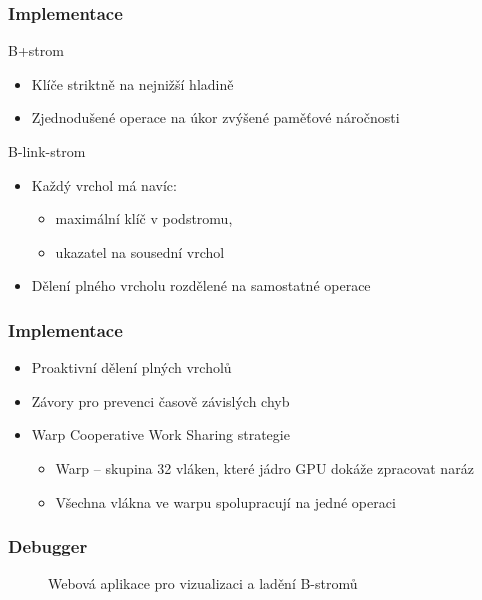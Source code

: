 \documentclass[aspectratio=169]{beamer}
\begin{document}
\begin{frame}
  \frametitle{Implementace}

  B+strom
  \begin{itemize}
    \item Klíče striktně na nejnižší hladině
    \item Zjednodušené operace na úkor zvýšené paměťové náročnosti
  \end{itemize}

  B-link-strom
  \begin{itemize}
    \item Každý vrchol má navíc:
          \begin{itemize}
            \item maximální klíč v podstromu,
            \item ukazatel na sousední vrchol
          \end{itemize}
    \item Dělení plného vrcholu rozdělené na samostatné operace
  \end{itemize}
\end{frame}

\begin{frame}
  \frametitle{Implementace}
  \begin{itemize}
    \item Proaktivní dělení plných vrcholů
    \item Závory pro prevenci časově závislých chyb
    \item Warp Cooperative Work Sharing strategie
          \begin{itemize}
            \item Warp -- skupina 32 vláken, které jádro GPU dokáže zpracovat naráz
            \item Všechna vlákna ve warpu spolupracují na jedné operaci
          \end{itemize}
  \end{itemize}
\end{frame}

\begin{frame}
  \frametitle{Debugger}
  \begin{figure}
    \caption{Webová aplikace pro vizualizaci a ladění B-stromů}
  \end{figure}
\end{frame}
\end{document}
